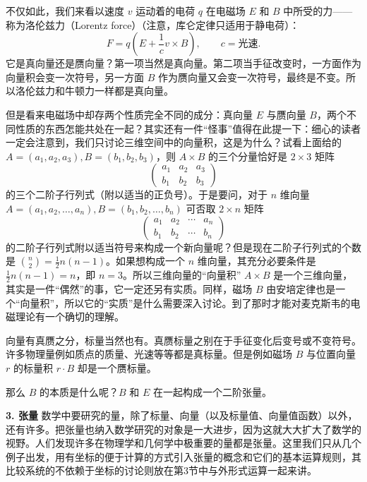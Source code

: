 不仅如此，我们来看以速度 $v$ 运动着的电荷 $q$ 在电磁场 $E$ 和 $B$ 中所受的力——称为洛伦兹力（Lorentz force）（注意，库仑定律只适用于静电荷）：
\[
 F=q\left(E+\frac1c v\times B\right),\qquad c=\text{光速}.
\]
它是真向量还是赝向量？第一项当然是真向量。第二项当手征改变时，一方面作为向量积会变一次符号，另一方面 $B$ 作为赝向量又会变一次符号，最终是不变。所以洛伦兹力和牛顿力一样都是真向量。

但是看来电磁场中却存两个性质完全不同的成分：真向量 $E$ 与赝向量 $B$，两个不同性质的东西怎能共处在一起？其实还有一件“怪事”值得在此提一下：细心的读者一定会注意到，我们只讨论三维空间中的向量积，这是为什么？试看上面给的 $A=(a_1,a_2,a_3),B=(b_1,b_2,b_3)$，则 $A\times B$ 的三个分量恰好是 $2\times3$ 矩阵
\begin{equation}
 \begin{pmatrix}a_1&a_2&a_3\\b_1&b_2&b_3\end{pmatrix}
 \tag{32}
\end{equation}
的三个二阶子行列式（附以适当的正负号）。于是要问，对于 $n$ 维向量 $A=(a_1,a_2,\ldots,a_n),B=(b_1,b_2,\ldots,b_n)$ 可否取 $2\times n$ 矩阵
\begin{equation}
 \begin{pmatrix}a_1&a_2&\cdots&a_n\\b_1&b_2&\cdots&b_n\end{pmatrix}
 \tag{33}
\end{equation}
的二阶子行列式附以适当符号来构成一个新向量呢？但是现在二阶子行列式的个数是 $\binom n2=\frac12n(n-1)$。如果想构成一个 $n$ 维向量，其充分必要条件是 $\frac12n(n-1)=n$，即 $n=3$。所以三维向量的“向量积” $A\times B$ 是一个三维向量，其实是一件“偶然”的事，它一定还另有实质。同样，磁场 $B$ 由安培定律也是一个“向量积”，所以它的“实质”是什么需要深入讨论。到了那时才能对麦克斯韦的电磁理论有一个确切的理解。

向量有真赝之分，标量当然也有。真赝标量之别在于手征变化后变号或不变符号。许多物理量例如质点的质量、光速等等都是真标量。但是例如磁场 $B$ 与位置向量 $r$ 的标量积 $r\cdot B$ 却是一个赝标量。

那么 $B$ 的本质是什么呢？$B$ 和 $E$ 在一起构成一个二阶张量。

\medskip
\noindent\textbf{3. 张量}\quad
数学中要研究的量，除了标量、向量（以及标量值、向量值函数）以外，还有许多。把张量也纳入数学研究的对象是一大进步，因为这就大大扩大了数学的视野。人们发现许多在物理学和几何学中极重要的量都是张量。这里我们只从几个例子出发，用有坐标的便于计算的方式引入张量的概念和它们的基本运算规则，其比较系统的不依赖于坐标的讨论则放在第3节中与外形式运算一起来讲。

